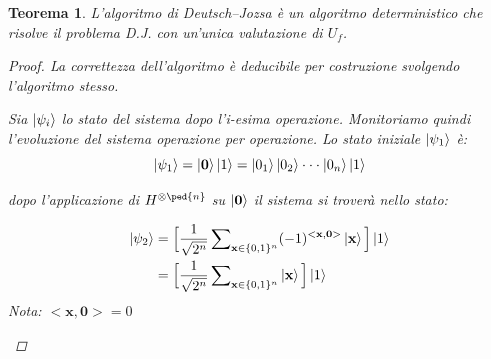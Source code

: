 \documentclass[12pt,a4paper,openright]{report}
\newtheorem{mythm}{Teorema}[chapter]
\begin{document}
\begin{mythm}
    L'algoritmo di Deutsch–Jozsa è un algoritmo deterministico che risolve il problema D.J. con un'unica valutazione di $U_f$.   

\begin{proof}
    La correttezza dell'algoritmo è deducibile per costruzione svolgendo l'algoritmo stesso.\par
    Sia $\ket{\psi_i}$ lo stato del sistema dopo l'i-esima operazione. Monitoriamo quindi l'evoluzione del sistema operazione per operazione.
    Lo stato iniziale $\ket{\psi_1}$ è:
\[    
    \ket{\psi_1} = \ket{\textbf{0}}\ket{1} = \ket{0_1}\ket{0_2}\cdot\cdot\cdot\ket{0_n}\ket{1}
\]

\noindent dopo l'applicazione di $H^{\otimes\ped{n}}$ su $\ket{\textbf{0}}$ il sistema si troverà nello stato:

\begin{centering}
    \begin{align*}
        \ket{\psi_2} &= \Big[\frac{1}{\sqrt{2^n}}\sum\nolimits_{\textbf{x}\in{\{0,1\}^n}}(-1)^{<\textbf{x},\textbf{0}>}\ket{\textbf{x}}\Big]\ket{1} \\ 
                     &= \Big[\frac{1}{\sqrt{2^n}}\sum\nolimits_{\textbf{x}\in{\{0,1\}^n}}\ket{\textbf{x}}\Big]\ket{1}
    \end{align*}
    \textit{Nota: $<\textbf{x},\textbf{0}> = 0$}
\end{centering}



\end{proof}
\end{mythm}
\end{document}
